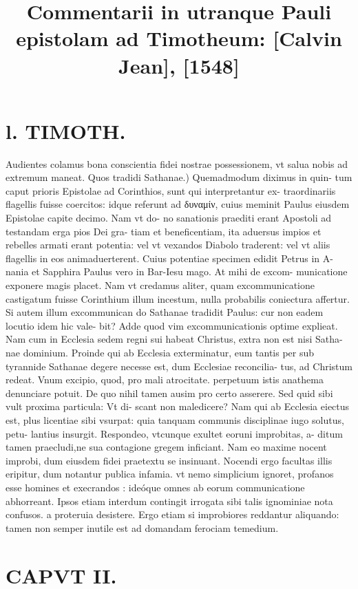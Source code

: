 \documentclass{article}
\begin{document}
\date{}
        \title{Commentarii in utranque Pauli epistolam ad Timotheum: [Calvin Jean], [1548]}
\maketitle
\tableofcontents
\clearpage
\begin{pages} 
\beginnumbering
        
\section*{l. TIMOTH. }
\marginpar{[ p.16 ]}\pstart Audientes colamus bona conscientia fidei nostrae possessionem, vt salua nobis ad extremum maneat.  \pend\pstart Quos tradidi Sathanae.) Quemadmodum diximus in quin- tum caput prioris Epistolae ad Corinthios, sunt qui interpretantur ex- traordinariis flagellis fuisse coercitos: idque referunt ad δυναμίν, cuius meminit Paulus eiusdem Epistolae capite decimo. Nam vt do- no sanationis praediti erant Apostoli ad testandam erga pios Dei gra- tiam et beneficentiam, ita aduersus impios et rebelles armati erant potentia: vel vt vexandos Diabolo traderent: vel vt aliis flagellis in eos animaduerterent. Cuius potentiae specimen edidit Petrus in A- nania et Sapphira Paulus vero in Bar-Iesu mago. At mihi de excom- municatione exponere magis placet. Nam vt credamus aliter, quam excommunicatione castigatum fuisse Corinthium illum incestum, nulla probabilis coniectura affertur. Si autem illum excommunican do Sathanae tradidit Paulus: cur non eadem locutio idem hic vale- bit? Adde quod vim excommunicationis optime explieat. Nam cum in Ecclesia sedem regni sui habeat Christus, extra non est nisi Satha- nae dominium. Proinde qui ab Ecclesia exterminatur, eum tantis per sub tyrannide Sathanae degere necesse est, dum Ecclesiae reconcilia- tus, ad Christum redeat. Vnum excipio, quod, pro mali atrocitate. perpetuum istis anathema denunciare potuit. De quo nihil tamen ausim pro certo asserere. Sed quid sibi vult proxima particula: Vt di- scant non maledicere? Nam qui ab Ecclesia eiectus est, plus licentiae sibi vsurpat: quia tanquam communis disciplinae iugo solutus, petu- lantius insurgit. Respondeo, vtcunque exultet eoruni improbitas, a- ditum tamen praecludi,ne sua contagione gregem inficiant. Nam eo maxime nocent improbi, dum eiusdem fidei praetextu se insinuant. Nocendi ergo facultas illis eripitur, dum notantur publica infamia. vt nemo simplicium ignoret, profanos esse homines et execrandos : ideóque omnes ab eorum communicatione abhorreant. Ipsos etiam interdum contingit irrogata sibi talis ignominiae nota confusos. a proteruia desistere. Ergo etiam si improbiores reddantur aliquando: tamen non semper inutile est ad domandam ferociam temedium.  \pend
\endnumbering\beginnumbering\section{CAPVT II.}
{}

\end{pages}
\end{document}
